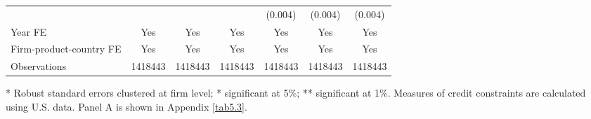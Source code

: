 \begin{table}[htbp]
{\begin{threeparttable}
\begin{tabular}{lcccccc}
		&       &       &       & (0.004) & (0.004) & (0.004) \\
		Year FE  & Yes   & Yes   & Yes   & Yes   & Yes   & Yes \\
		Firm-product-country FE & Yes   & Yes   & Yes   & Yes   & Yes   & Yes \\
		Observations & 1418443 & 1418443 & 1418443 & 1418443 & 1418443 & 1418443 \\
		\bottomrule	
	\end{tabular}
	\begin{tablenotes}
		\footnotesize
		\item[*] Robust standard errors clustered at firm level; * significant at 5\%; ** significant at 1\%. Measures of credit constraints are calculated using U.S. data. Panel A is shown in Appendix \ref{tab5.3}.
	\end{tablenotes}
	\end{threeparttable}
	\label{tabA.1}
	}
\end{table}


